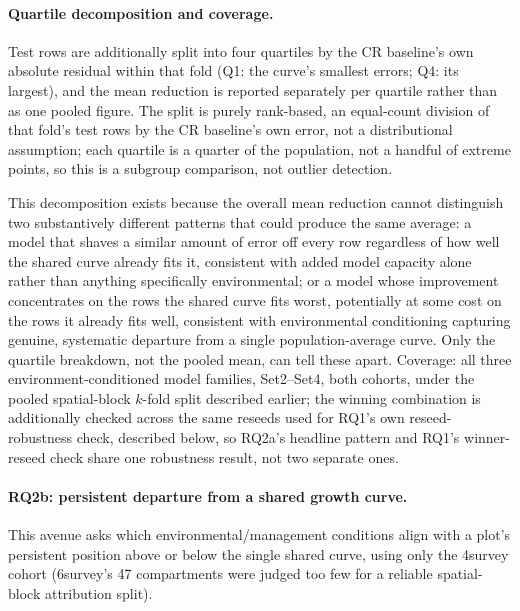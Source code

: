 \documentclass[11pt,a4paper]{report}
\begin{document}
\paragraph*{Quartile decomposition and coverage.}
Test rows are additionally split into four quartiles by the CR baseline's own absolute residual
within that fold (Q1: the curve's smallest errors; Q4: its largest), and the mean reduction is
reported separately per quartile rather than as one pooled figure. The split is purely rank-based,
an equal-count division of that fold's test rows by the CR baseline's own error, not a
distributional assumption; each quartile is a quarter of the population, not a handful of extreme
points, so this is a subgroup comparison, not outlier detection.

This decomposition exists because the overall mean reduction cannot distinguish two substantively
different patterns that could produce the same average: a model that shaves a similar amount of
error off every row regardless of how well the shared curve already fits it, consistent with added
model capacity alone rather than anything specifically environmental; or a model whose improvement
concentrates on the rows the shared curve fits worst, potentially at some cost on the rows it
already fits well, consistent with environmental conditioning capturing genuine, systematic
departure from a single population-average curve. Only the quartile breakdown, not the pooled
mean, can tell these apart. Coverage: all three environment-conditioned
model families, Set2--Set4, both cohorts, under the pooled spatial-block $k$-fold split described
earlier; the winning combination is additionally checked across the same reseeds used for RQ1's
own reseed-robustness check, described below, so RQ2a's headline pattern and RQ1's winner-reseed
check share one robustness result, not two separate ones.

\paragraph*{RQ2b: persistent departure from a shared growth curve.}
This avenue asks which environmental/management conditions align with a plot's persistent
position above or below the single shared curve, using only the 4survey cohort (6survey's 47
compartments were judged too few for a reliable spatial-block attribution split).
\end{document}
